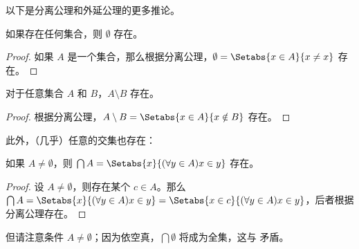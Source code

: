 \documentclass[../../../include/open-logic-section]{subfiles}
\begin{document}
以下是分离公理和外延公理的更多推论。

\begin{prop}
如果存在任何集合，则 $\emptyset$ 存在。
\end{prop}

\begin{proof}
如果 $A$ 是一个集合，那么根据分离公理，$\emptyset = \Setabs{x \in A}{x \neq x}$ 存在。
\end{proof}

\begin{prop}
对于任意集合 $A$ 和 $B$，$A \setminus B$ 存在。
\end{prop}

\begin{proof}
根据分离公理，$A \setminus B = \Setabs{x \in A}{x \notin B}$ 存在。
\end{proof}

此外，（几乎）任意的交集也存在：

\begin{prop}
如果 $A \neq \emptyset$，则 $\bigcap A = \Setabs{x}{(\forall y \in A)x \in y}$ 存在。
\end{prop}

\begin{proof}
设 $A \neq \emptyset$，则存在某个 $c \in A$。那么 $\bigcap A = \Setabs{x}{(\forall y \in A)x \in y} = \Setabs{x \in c}{(\forall y \in A)x \in y}$，后者根据分离公理存在。
\end{proof}

但请注意条件 $A \neq \emptyset$；因为依空真，$\bigcap \emptyset$ 将成为全集，这与  矛盾。
\end{document}
